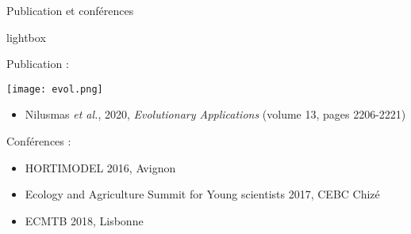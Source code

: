 \begin{frame}{Publication et conférences}

 \begin{beamercolorbox}[sep=1mm,rounded=true]{lightbox}

    
Publication :

\texttt{[image: evol.png]} \quad

 \begin{itemize}[itemsep=3mm]
 \item  Nilusmas \textit{et al.}, 2020, \textit{Evolutionary Applications} (volume 13, pages 2206-2221)
 \end{itemize}

Conférences :
 \begin{itemize}[itemsep=3mm]
 \item HORTIMODEL 2016, Avignon
 \item Ecology and Agriculture Summit for Young scientists 2017, CEBC Chizé
 \item ECMTB 2018, Lisbonne
 
 \end{itemize}
\end{beamercolorbox}


\end{frame}
%
%
%
%       
%
%
